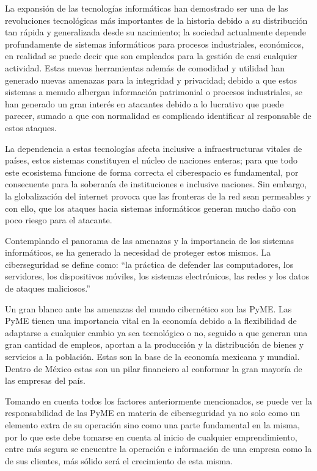 \documentclass[10pt]{article}
\begin{document}
La expansión de las tecnologías informáticas han demostrado ser una de las revoluciones tecnológicas más importantes de la historia debido a su distribución tan rápida y generalizada desde su nacimiento; la sociedad actualmente depende profundamente de sistemas informáticos para procesos industriales, económicos, en realidad se puede decir que son empleados para la gestión de casi cualquier actividad. Estas nuevas herramientas además de comodidad y utilidad han generado nuevas amenazas para la integridad y privacidad; debido a que estos sistemas a menudo albergan información patrimonial o procesos industriales, se han generado un gran interés en atacantes debido a lo lucrativo que puede parecer, sumado a que con normalidad es complicado identificar al responsable de estos ataques.

La dependencia a estas tecnologías afecta inclusive a infraestructuras vitales de países, estos sistemas constituyen el núcleo de naciones enteras; para que todo este ecosistema funcione de forma correcta el ciberespacio es fundamental, por consecuente para la soberanía de instituciones e inclusive naciones. Sin embargo, la globalización del internet provoca que las fronteras de la red sean permeables y con ello, que los ataques hacia sistemas informáticos generan mucho daño con poco riesgo para el atacante.

Contemplando el panorama de las amenazas y la importancia de los sistemas informáticos, se ha generado la necesidad de proteger estos mismos. La ciberseguridad se define como: ``la práctica de defender las computadores, los servidores, los dispositivos móviles, los sistemas electrónicos, las redes y los datos de ataques maliciosos.'' \cite{10}

Un gran blanco ante las amenazas del mundo cibernético son las PyME. Las PyME tienen una importancia vital en la economía debido a la flexibilidad de adaptarse a cualquier cambio ya sea tecnológico o no, seguido a que generan una gran cantidad de empleos, aportan a la producción y la distribución de bienes y servicios a la población. Estas son la base de la economía mexicana y mundial. Dentro de México estas son un pilar financiero al conformar la gran mayoría de las empresas del país.

Tomando en cuenta todos los factores anteriormente mencionados, se puede ver la responsabilidad de las PyME en materia de ciberseguridad ya no solo como un elemento extra de su operación sino como una parte fundamental en la misma, por lo que este debe tomarse en cuenta al inicio de cualquier emprendimiento, entre más segura se encuentre la operación e información de una empresa como la de sus clientes, más sólido será el crecimiento de esta misma.
\end{document}
